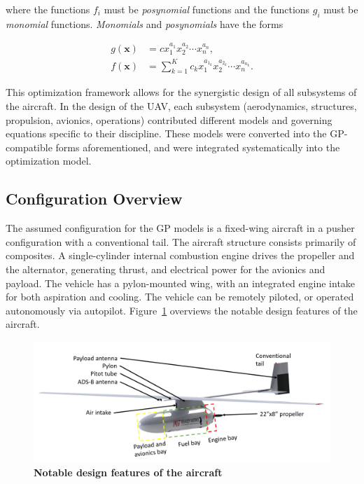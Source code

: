 \documentclass[journal]{aiaa-tc}%
\begin{document}
 where the functions $f_i$ must be \emph{posynomial} functions and the functions $g_i$ must be \emph{monomial} functions. \emph{Monomials} and \emph{posynomials} have the forms
 
\begin{align}
\label{e:mon}  g(\mathbf{x}) &= c x_1^{a_1} x_2^{a_2} \dotsm x_n^{a_n} , \\  \label{e:pos}  f(\mathbf{x}) &= \displaystyle\sum_{k=1}^K c_k x_1^{a_{1_k}} x_2^{a_{2_k}}
\dotsm x_n^{a_{n_k}}.  
\end{align}

This optimization framework allows for the synergistic design of all subsystems of the aircraft. In the design of the UAV, each subsystem (aerodynamics, structures, propulsion, avionics, operations) contributed different models and governing equations specific to their discipline. These models were converted into the GP-compatible forms aforementioned, and were integrated systematically into the optimization model. 

\subsection{Configuration Overview}

The assumed configuration for the GP models is a fixed-wing aircraft in a pusher configuration with a conventional tail. The aircraft structure consists primarily of composites. A single-cylinder internal combustion engine drives the propeller and the alternator, generating thrust, and electrical power for the avionics and payload. The vehicle has a pylon-mounted wing, with an integrated engine intake for both aspiration and cooling. The vehicle can be remotely piloted, or operated autonomously via autopilot. Figure~\ref{f:features} overviews the notable design features of the aircraft.

\begin{figure}[h!]
    \begin{center}
    \includegraphics[width = .75\textwidth]{features}
     \caption{ \textbf{Notable design features of the aircraft} }
    \label{f:features}
    \end{center}
\end{figure}
\end{document}
